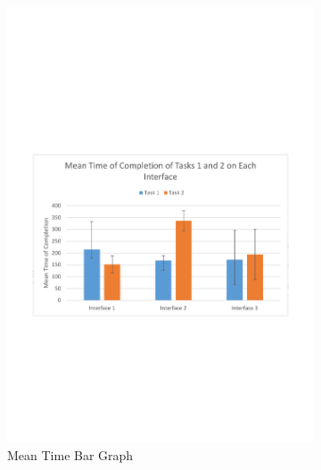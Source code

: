 \documentclass{l4proj}
\begin{document}
{\begin{figure}[H]
	\begin{subfigure}{.5\textwidth}
		\centering
		\includegraphics[width=\textwidth]{charts/table1.pdf}
		\caption{Mean Time Bar Graph}
		\label{ch:meantimebargraph}
	\end{subfigure}
	\begin{subfigure}{.5\textwidth}
		\centering

\end{subfigure}
\end{figure}}
\end{document}
